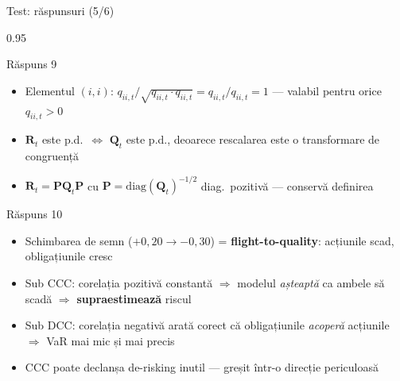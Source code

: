 \documentclass[9pt, aspectratio=169, t]{beamer}
\begin{document}
\begin{frame}{Test: răspunsuri (5/6)}
    \begin{cminipage}{0.95\textwidth}
    {\scriptsize
    \begin{exampleblock}{Răspuns 9}
        \begin{itemize}\setlength{\itemsep}{0pt}
            \item Elementul $(i,i)$: $q_{ii,t}/\sqrt{q_{ii,t} \cdot q_{ii,t}} = q_{ii,t}/q_{ii,t} = 1$ --- valabil pentru orice $q_{ii,t} > 0$
            \item $\mathbf{R}_t$ este p.d.\ $\Leftrightarrow$ $\mathbf{Q}_t$ este p.d., deoarece rescalarea este o transformare de congruență
            \item $\mathbf{R}_t = \mathbf{P}\mathbf{Q}_t\mathbf{P}$ cu $\mathbf{P} = \text{diag}(\mathbf{Q}_t)^{-1/2}$ diag.\ pozitivă --- conservă definirea
        \end{itemize}
    \end{exampleblock}
    \begin{exampleblock}{Răspuns 10}
        \begin{itemize}\setlength{\itemsep}{0pt}
            \item Schimbarea de semn ($+0{,}20 \to -0{,}30$) = \textbf{flight-to-quality}: acțiunile scad, obligațiunile cresc
            \item Sub CCC: corelația pozitivă constantă $\Rightarrow$ modelul \textit{așteaptă} ca ambele să scadă $\Rightarrow$ \textbf{supraestimează} riscul
            \item Sub DCC: corelația negativă arată corect că obligațiunile \textit{acoperă} acțiunile $\Rightarrow$ VaR mai mic și mai precis
            \item CCC poate declanșa de-risking inutil --- greșit într-o direcție periculoasă
        \end{itemize}
    \end{exampleblock}
    }
    \end{cminipage}
\end{frame}
\end{document}
